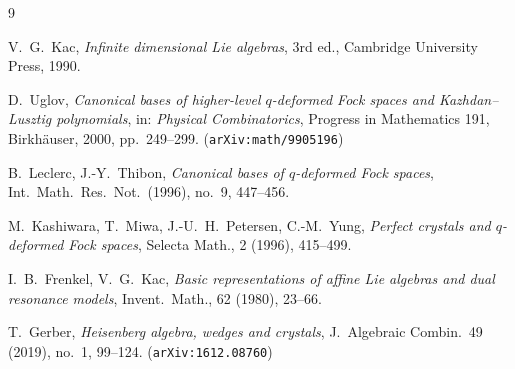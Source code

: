 \documentclass[11pt]{article}
\theoremstyle{definition}
\begin{document}
\begin{thebibliography}{9}

V.~G.~Kac,
\emph{Infinite dimensional Lie algebras},
3rd ed., Cambridge University Press, 1990.

D.~Uglov,
\emph{Canonical bases of higher-level $q$-deformed Fock spaces and Kazhdan--Lusztig polynomials},
in: \emph{Physical Combinatorics}, Progress in Mathematics 191, Birkh\"auser, 2000, pp.~249--299.
(\texttt{arXiv:math/9905196})

B.~Leclerc, J.-Y.~Thibon,
\emph{Canonical bases of $q$-deformed Fock spaces},
Int.\ Math.\ Res.\ Not.\ (1996), no.~9, 447--456.

M.~Kashiwara, T.~Miwa, J.-U.~H.~Petersen, C.-M.~Yung,
\emph{Perfect crystals and $q$-deformed Fock spaces},
Selecta Math., 2 (1996), 415--499.

I.~B.~Frenkel, V.~G.~Kac,
\emph{Basic representations of affine Lie algebras and dual resonance models},
Invent.\ Math., 62 (1980), 23--66.

T.~Gerber,
\emph{Heisenberg algebra, wedges and crystals},
J.~Algebraic Combin.\ 49 (2019), no.~1, 99--124.
(\texttt{arXiv:1612.08760})

\end{thebibliography}
\end{document}
